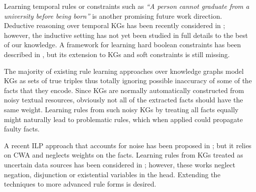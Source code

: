 Learning temporal rules or constraints such as \emph{``A person cannot graduate from a university before being born''} is another promising future work direction. Deductive reasoning over temporal KGs has been recently considered in \cite{DBLP:conf/aaai/ChekolPSS17}; however, the inductive setting has not yet been studied in full details to the best of our knowledge. A framework for learning hard boolean constraints has been described in \cite{DBLP:conf/aaai/RaedtPT18}, but its extension to KGs and soft constraints is still missing. 

The majority of existing rule learning approaches over knowledge graphs model KGs as sets of true triples thus totally ignoring possible inaccuracy of some of the facts that they encode. Since KGs are normally automatically constructed from noisy textual resources, obviously not all of the extracted facts should have the same weight. Learning rules from such noisy KGs by treating all facts equally might naturally lead to problematic rules, which when applied could propagate faulty facts. 

A recent ILP approach that accounts for noise has been proposed in \cite{sigmailp}; but it relies on CWA and neglects weights on the facts.
Learning rules from KGs treated as uncertain data sources has  been considered in \cite{probfoil,DBLP:conf/ijcai/RaedtDTBV15,DBLP:conf/clima/CorapiSIR11}; however, these works neglect negation, disjunction or existential variables in the head. %
Extending the techniques to more advanced rule forms is desired.



